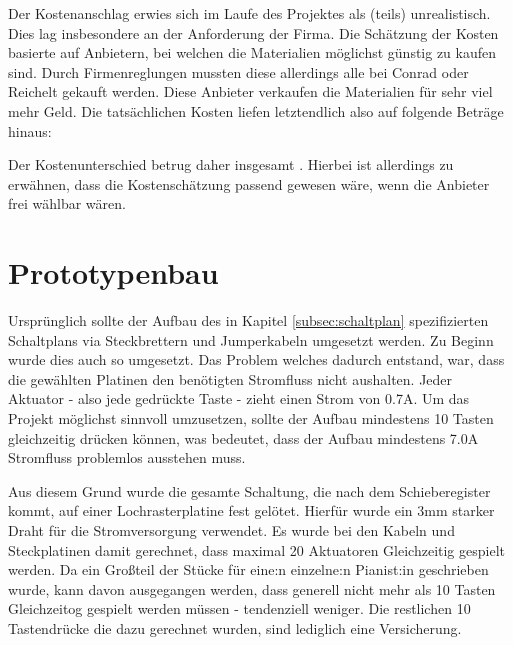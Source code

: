 
Der Kostenanschlag erwies sich im Laufe des Projektes als (teils) unrealistisch. Dies lag insbesondere an der Anforderung
der Firma. Die Schätzung der Kosten basierte auf Anbietern, bei welchen die Materialien möglichst günstig zu kaufen sind.
Durch Firmenreglungen mussten diese allerdings alle bei Conrad oder Reichelt
gekauft werden. Diese Anbieter verkaufen die Materialien für sehr viel mehr Geld. Die tatsächlichen Kosten liefen
letztendlich also auf folgende Beträge hinaus: \newline %

Der Kostenunterschied betrug daher insgesamt .
Hierbei ist allerdings zu erwähnen, dass die Kostenschätzung passend gewesen wäre, wenn die Anbieter frei wählbar wären.

\section{Prototypenbau} \label{Prototyp}
Ursprünglich sollte der Aufbau des in Kapitel \ref{subsec:schaltplan} spezifizierten Schaltplans via Steckbrettern und
Jumperkabeln umgesetzt werden.
Zu Beginn wurde dies auch so umgesetzt. Das Problem welches dadurch entstand, war, dass die gewählten Platinen den
benötigten Stromfluss nicht aushalten.\newline
Jeder Aktuator - also jede gedrückte Taste - zieht einen Strom von 0.7A. Um das Projekt möglichst sinnvoll umzusetzen,
sollte der Aufbau mindestens 10 Tasten gleichzeitig drücken können, was bedeutet, dass der Aufbau mindestens 7.0A
Stromfluss problemlos ausstehen muss.

Aus diesem Grund wurde die gesamte Schaltung, die nach dem Schieberegister kommt, auf einer Lochrasterplatine fest gelötet.
Hierfür wurde ein 3mm starker Draht für die Stromversorgung verwendet. \newline
Es wurde bei den Kabeln und Steckplatinen damit gerechnet, dass maximal 20 Aktuatoren Gleichzeitig gespielt werden.
Da ein Großteil der Stücke für eine:n einzelne:n Pianist:in geschrieben wurde, kann davon ausgegangen werden, dass
generell nicht mehr als 10 Tasten Gleichzeitog gespielt werden müssen - tendenziell weniger. Die restlichen 10
Tastendrücke die dazu gerechnet wurden, sind lediglich eine Versicherung.

